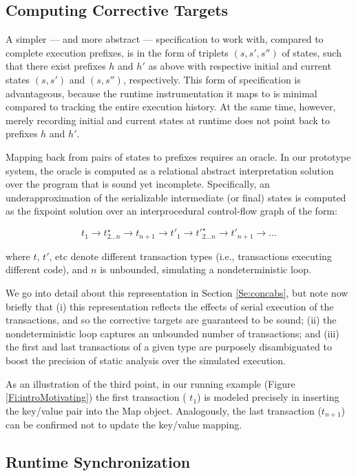 \subsection{Computing Corrective Targets}

A simpler --- and more abstract --- specification to work with, compared to complete execution prefixes, is in the form of triplets $(s,s',s'')$ of states, such that there exist prefixes $h$ and $h'$ as above with respective initial and current states $(s,s')$ and $(s,s'')$, respectively. This form of specification is advantageous, because the runtime instrumentation it maps to is minimal compared to tracking the entire execution history. At the same time, however, merely recording initial and current states at runtime does not point back to prefixes $h$ and $h'$.

Mapping back from pairs of states to prefixes requires an oracle. In our prototype system, the oracle is computed as a relational abstract interpretation solution over the program that is sound yet incomplete. Specifically, an underapproximation of the serializable intermediate (or final) states is computed as the fixpoint solution over an interprocedural control-flow graph of the form: 
\begin{center}
$$
	t_1 \rightarrow t^\star_{2 \ldots n} \rightarrow t_{n+1} \rightarrow t'_1 \rightarrow t'^\star_{2 \ldots n} \rightarrow t'_{n+1} \rightarrow \ldots
$$
\end{center}
where $t$, $t'$, etc denote different transaction types (i.e., transactions executing different code), and $n$ is unbounded, simulating a nondeterministic loop. 

We go into detail about this representation in Section \ref{Se:concabs}, but note now briefly that (i) this representation reflects the effects of serial execution of the transactions, and so the corrective targets are guaranteed to be sound; (ii) the nondeterministic loop captures an unbounded number of transactions; and (iii) the first and last transactions of a given type are purposely disambiguated to boost the precision of static analysis over the simulated execution.

As an illustration of the third point, in our running example (Figure \ref{Fi:introMotivating}) the first transaction ( $t_1$) is modeled precisely in inserting the key/value pair into the {\sf Map} object. Analogously, the last transaction ($t_{n+1}$) can be confirmed not to update the key/value mapping.

\subsection{Runtime Synchronization} 

